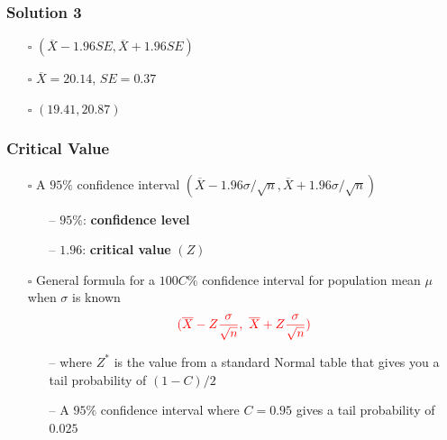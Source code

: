 \documentclass[handout]{beamer}
\begin{document}
\begin{frame}
    \frametitle{Solution 3}
    \begin{itemize}[wide = 0pt]
        \item[$\square$] $(\overline{X}-1.96SE, \overline{X}+1.96SE)$
        \vspace{5pt}
        \item[$\square$] $\overline{X}=20.14$, $SE=0.37$
        \vspace{5pt}
        \item[$\square$] $(19.41, 20.87)$
    \end{itemize} 
    
\end{frame}

\begin{frame}
    \frametitle{Critical Value}
    \begin{itemize}[wide = 0pt]
        \item[$\square$] A $95\%$ confidence interval $(\overline{X}-1.96\sigma/\sqrt{n}, \overline{X}+1.96\sigma/\sqrt{n})$
            \begin{itemize}
                \item[--] $95\%$: \textbf{confidence level}
                \item[--] $1.96$: \textbf{critical value} $(Z)$
            \end{itemize}
        \item[$\square$] General formula for a $100C\%$ confidence interval for population mean $\mu$ when $\sigma$ is known
        \begin{equation*}
            {\color{red}(\overline{X}-Z\frac{\sigma}{\sqrt{n}},\  \overline{X}+Z\frac{\sigma}{\sqrt{n}})}
        \end{equation*}
        \begin{itemize}
            \item[--] where $Z^*$ is the value from a standard Normal table that gives you a tail probability of $(1-C)/2$
            \item[--] A $95\%$ confidence interval where $C=0.95$ gives a tail probability of $0.025$
        \end{itemize}
    \end{itemize}
    \vspace*{\fill}
\end{frame}
\end{document}

